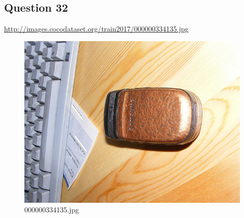 \subsection*{Question 32}
\url{http://images.cocodataset.org/train2017/000000334135.jpg}
    \begin{figure}[h]
        \centering
        \includegraphics[width=0.8\linewidth]{../image set/easy/000000334135.jpg}
        \caption{000000334135.jpg}
    \end{figure}
